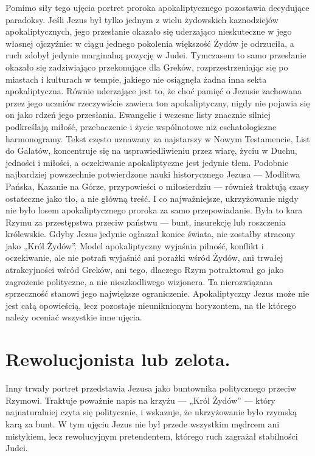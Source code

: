 Pomimo siły tego ujęcia portret proroka apokaliptycznego pozostawia decydujące paradoksy.
Jeśli Jezus był tylko jednym z wielu żydowskich kaznodziejów apokaliptycznych, jego przesłanie okazało się uderzająco nieskuteczne w jego własnej ojczyźnie: w ciągu jednego pokolenia większość Żydów je odrzuciła, a ruch zdobył jedynie marginalną pozycję w Judei.
Tymczasem to samo przesłanie okazało się zadziwiająco przekonujące dla Greków, rozprzestrzeniając się po miastach i kulturach w tempie, jakiego nie osiągnęła żadna inna sekta apokaliptyczna.
Równie uderzające jest to, że choć pamięć o Jezusie zachowana przez jego uczniów rzeczywiście zawiera ton apokaliptyczny, nigdy nie pojawia się on jako rdzeń jego przesłania.
Ewangelie i wczesne listy znacznie silniej podkreślają miłość, przebaczenie i życie wspólnotowe niż eschatologiczne harmonogramy.
Tekst często uznawany za najstarszy w Nowym Testamencie, List do Galatów, koncentruje się na usprawiedliwieniu przez wiarę, życiu w Duchu, jedności i miłości, a oczekiwanie apokaliptyczne jest jedynie tłem.
Podobnie najbardziej powszechnie potwierdzone nauki historycznego Jezusa — Modlitwa Pańska, Kazanie na Górze, przypowieści o miłosierdziu — również traktują czasy ostateczne jako tło, a nie główną treść.
I co najważniejsze, ukrzyżowanie nigdy nie było losem apokaliptycznego proroka za samo przepowiadanie.
Była to kara Rzymu za przestępstwa przeciw państwu — bunt, insurekcję lub roszczenia królewskie.
Gdyby Jezus jedynie ogłaszał koniec świata, nie zostałby stracony jako „Król Żydów”.
Model apokaliptyczny wyjaśnia pilność, konflikt i oczekiwanie, ale nie potrafi wyjaśnić ani porażki wśród Żydów, ani trwałej atrakcyjności wśród Greków, ani tego, dlaczego Rzym potraktował go jako zagrożenie polityczne, a nie nieszkodliwego wizjonera.
Ta nierozwiązana sprzeczność stanowi jego największe ograniczenie.
Apokaliptyczny Jezus może nie jest całą opowieścią, lecz pozostaje nieuniknionym horyzontem, na tle którego należy oceniać wszystkie inne ujęcia.

\section{Rewolucjonista lub zelota.}\label{sec:revolutionary}

Inny trwały portret przedstawia Jezusa jako buntownika politycznego przeciw Rzymowi.
Traktuje poważnie napis na krzyżu — „Król Żydów” — który najnaturalniej czyta się politycznie, i wskazuje, że ukrzyżowanie było rzymską karą za bunt.
W tym ujęciu Jezus nie był przede wszystkim mędrcem ani mistykiem, lecz rewolucyjnym pretendentem, którego ruch zagrażał stabilności Judei.

